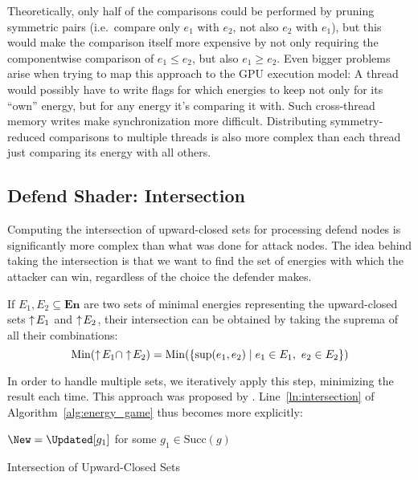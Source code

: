 Theoretically, only half of the comparisons could be performed
by pruning symmetric pairs
(i.e.\ compare only $e_1$ with $e_2$, not also $e_2$ with $e_1$),
but this would make the comparison itself more expensive by not only requiring
the componentwise comparison of $e_1 \leq e_2$, but also $e_1 \geq e_2$.
Even bigger problems arise when trying to map this approach to the GPU
execution model:
A thread would possibly have to write flags for which energies to keep not only
for its \enquote{own} energy,
but for any energy it's comparing it with.
Such cross-thread memory writes make synchronization more difficult.
Distributing symmetry-reduced comparisons to multiple threads is also
more complex than each thread just comparing its energy with all others.


\subsection{Defend Shader: Intersection}\label{subsec:defend_shader}

Computing the intersection of upward-closed sets for processing defend nodes
is significantly more complex than what was done for attack nodes.
The idea behind taking the intersection is that we want to find the set of
energies with which the attacker can win,
regardless of the choice the defender makes.

If $E_1, E_2 \subseteq \mathbf{En}$ are two sets of minimal energies
representing the upward-closed sets $\uparrow\! E_1$ and $\uparrow\! E_2$,
their intersection can be obtained
by taking the suprema of all their combinations:
\begin{equation*}
    \mathrm{Min} (\uparrow\! E_1 \cap \uparrow\! E_2 ) =
    \mathrm{Min} (\{ \sup(e_1, e_2) \mid e_1 \in E_1,\ e_2 \in E_2 \})
\end{equation*}

In order to handle multiple sets, we iteratively apply this step,
minimizing the result each time.
This approach was proposed by \textcite{brihaye2023multi}.
Line~\ref{ln:intersection} of Algorithm~\ref{alg:energy_game}
thus becomes more explicitly:

\begin{algorithm}[H]\label{alg:intersection}
    \DontPrintSemicolon

    $\New = \Updated[g_1]$ for some $g_1 \in \mathrm{Succ}(g)$\;

    \caption{Intersection of Upward-Closed Sets}
\end{algorithm}

